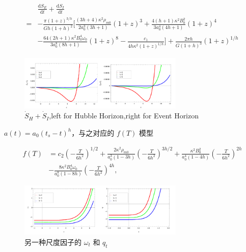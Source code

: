 \documentclass[aps,prl,preprint,groupedaddress,showkeys]{revtex4-2}
\begin{document}
$$
\begin{aligned}
    &\frac{\mathrm{d}S_E }{\mathrm{d}t } + \frac{\mathrm{d}S_I }{\mathrm{d}t } \\
    =&-\frac{\pi(1+z)^{3/h} }{Gh(1+h)^2 } \bigg[\frac{(3h+4)\kappa^2\rho_{m0} }{2a_0^3(3h+1) }(1+z)^3 + \frac{4(h+1)\kappa^2 B_0^2 }{3a_0^4(4h+1) } (1+z)^4 \\
    &- \frac{64(2h+1)\kappa^2 B_0^4 \omega_0 }{3a_0^8 (8h+1) } (1+z)^8 - \frac{c_1 }{4h\kappa^2(1+z)^{1/h} } \bigg] + \frac{2\pi h }{G (1+h)^3 } (1+z)^{1/h}
\end{aligned}
$$

\begin{figure}
    \centering
    \includegraphics[width=0.7\textwidth]{fig/fig13.png}
    \caption{$\dot{S}_H+\dot{S}_I$,left for Hubble Horizon,right for Event Horizon}
\end{figure}


$a(t)=a_0(t_s-t)^h$，与之对应的 $f(T)$ 模型
    
$$
\begin{aligned}
    f(T)
    &=c_2\left(-\frac{T }{6h^2 }  \right)^{1/2} + \frac{2\kappa^2\rho_{m0} }{a_0^3(1-3h) } \left(-\frac{T }{6h^2 }  \right)^{3h/2} + \frac{\kappa^2 B_0^2 }{a_0^4(1-4h) } \left(-\frac{T }{6h^2 }  \right)^{2h} \\
    &- \frac{8\kappa^2 B_0^4 \omega_0 }{a_0^8(1-8h) } \left(-\frac{T }{6h^2 }  \right)^{4h},
\end{aligned}
$$
\begin{figure}
    \centering
    \includegraphics[width=0.7\textwidth]{fig/fig14.png}
    \caption{另一种尺度因子的 $\omega_t$ 和 $q_t$}
\end{figure}
\end{document}
